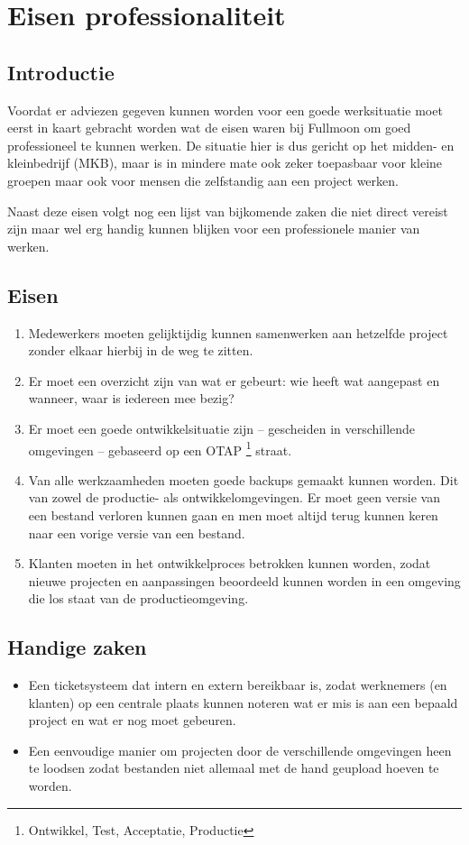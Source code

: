 \chapter{Eisen professionaliteit}

\section{Introductie}

Voordat er adviezen gegeven kunnen worden voor een goede werksituatie moet eerst in kaart gebracht worden wat de eisen waren bij Fullmoon om goed professioneel te kunnen werken. De situatie hier is dus gericht op het midden- en kleinbedrijf (MKB), maar is in mindere mate ook zeker toepasbaar voor kleine groepen maar ook voor mensen die zelfstandig aan een project werken.

Naast deze eisen volgt nog een lijst van bijkomende zaken die niet direct vereist zijn maar wel erg handig kunnen blijken voor een professionele manier van werken.

\section{Eisen}

\begin{enumerate}
  \item Medewerkers moeten gelijktijdig kunnen samenwerken aan hetzelfde project zonder elkaar hierbij in de weg te zitten.
  \item Er moet een overzicht zijn van wat er gebeurt: wie heeft wat aangepast en wanneer, waar is iedereen mee bezig?
  \item Er moet een goede ontwikkelsituatie zijn -- gescheiden in verschillende omgevingen -- gebaseerd op een OTAP \footnote{Ontwikkel, Test, Acceptatie, Productie} straat.
  \item Van alle werkzaamheden moeten goede backups gemaakt kunnen worden. Dit van zowel de productie- als ontwikkelomgevingen. Er moet geen versie van een bestand verloren kunnen gaan en men moet altijd terug kunnen keren naar een vorige versie van een bestand.
  \item Klanten moeten in het ontwikkelproces betrokken kunnen worden, zodat nieuwe projecten en aanpassingen beoordeeld kunnen worden in een omgeving die los staat van de productieomgeving.
\end{enumerate}

\section{Handige zaken}

\begin{itemize}
  \item Een ticketsysteem dat intern en extern bereikbaar is, zodat werknemers (en klanten) op een centrale plaats kunnen noteren wat er mis is aan een bepaald project en wat er nog moet gebeuren.
  \item Een eenvoudige manier om projecten door de verschillende omgevingen heen te loodsen zodat bestanden niet allemaal met de hand geupload hoeven te worden.
\end{itemize}
